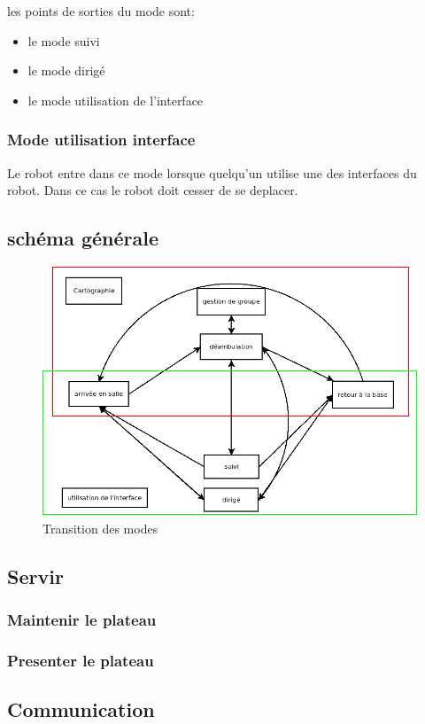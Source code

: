 les points de sorties du mode sont:
\begin{itemize}
\item le mode suivi
\item le mode dirigé
\item le mode utilisation de l'interface\\
\end{itemize}

\subsubsection{Mode utilisation interface}
Le robot entre dans ce mode lorsque quelqu'un utilise une des
interfaces du robot. Dans ce cas le robot doit cesser de se deplacer.

\subsection{schéma générale}

\begin{figure}[h]
\begin{center}
\includegraphics[scale=0.55]{Images/transition_mode.png}
\caption{Transition des modes}
\label{Transition des modes}
\end{center}
\end{figure}

\subsection{Servir}

\subsubsection{Maintenir le plateau}

\subsubsection{Presenter le plateau}

\subsection{Communication}
 
